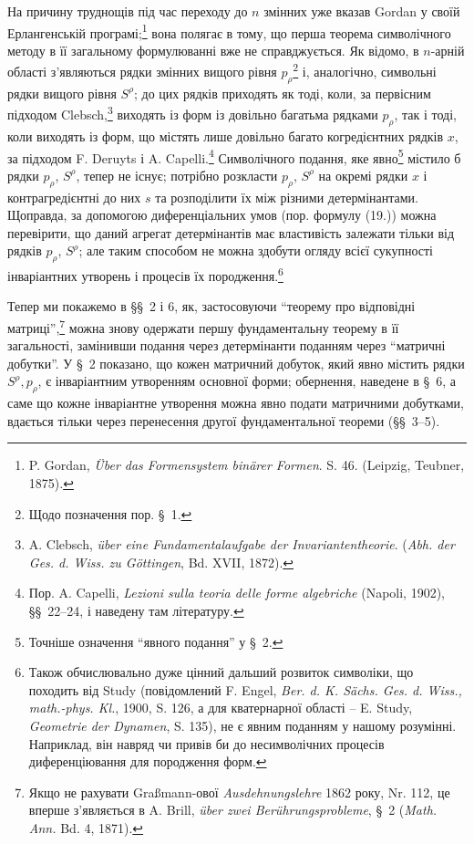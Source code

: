 \documentclass[11pt]{article}
\begin{document}
На причину труднощів під час переходу до $n$ змінних уже вказав Gordan у своїй Ерлангенській програмі;\footnote{P. Gordan, \emph{Über das Formensystem binärer Formen}. S. 46. (Leipzig, Teubner, 1875).} вона полягає в тому, що перша теорема символічного методу в її загальному формулюванні вже не справджується. Як відомо, в $n$-арній області з'являються рядки змінних вищого рівня $p_\rho$\footnote{Щодо позначення пор. \S\ 1.} і, аналогічно, символьні рядки вищого рівня $S^\rho$; до цих рядків приходять як тоді, коли, за первісним підходом Clebsch,\footnote{A. Clebsch, \emph{über eine Fundamentalaufgabe der Invariantentheorie}. (\emph{Abh. der Ges. d. Wiss. zu Göttingen}, Bd. XVII, 1872).} виходять із форм із довільно багатьма рядками $p_\rho$, так і тоді, коли виходять із форм, що містять лише довільно багато когредієнтних рядків $x$, за підходом F. Deruyts і A. Capelli.\footnote{Пор. A. Capelli, \emph{Lezioni sulla teoria delle forme algebriche} (Napoli, 1902), \S\S\ 22--24, і наведену там літературу.} Символічного подання, яке явно\footnote{Точніше означення ``явного подання'' у \S\ 2.} містило б рядки $p_\rho$, $S^\rho$, тепер не існує; потрібно розкласти $p_\rho$, $S^\rho$ на окремі рядки $x$ і контрагредієнтні до них $s$ та розподілити їх між різними детермінантами. Щоправда, за допомогою диференціальних умов (пор. формулу (19.)) можна перевірити, що даний агрегат детермінантів має властивість залежати тільки від рядків $p_\rho$, $S^\rho$; але таким способом не можна здобути огляду всієї сукупності інваріантних утворень і процесів їх породження.\footnote{Також обчислювально дуже цінний дальший розвиток символіки, що походить від Study (повідомлений F. Engel, \emph{Ber. d. K. Sächs. Ges. d. Wiss., math.-phys. Kl.}, 1900, S. 126, а для кватернарної області -- E. Study, \emph{Geometrie der Dynamen}, S. 135), не є явним поданням у нашому розумінні. Наприклад, він навряд чи привів би до несимволічних процесів диференціювання для породження форм.}

Тепер ми покажемо в \S\S\ 2 і 6, як, застосовуючи ``теорему про відповідні матриці'',\footnote{Якщо не рахувати Graßmann-ової \emph{Ausdehnungslehre} 1862 року, Nr. 112, це вперше з'являється в A. Brill, \emph{über zwei Berührungsprobleme}, \S\ 2 (\emph{Math. Ann.} Bd. 4, 1871).} можна знову одержати першу фундаментальну теорему в її загальності, замінивши подання через детермінанти поданням через ``матричні добутки''. У \S\ 2 показано, що кожен матричний добуток, який явно містить рядки $S^\rho,p_\rho$, є інваріантним утворенням основної форми; обернення, наведене в \S\ 6, а саме що кожне інваріантне утворення можна явно подати матричними добутками, вдається тільки через перенесення другої фундаментальної теореми (\S\S\ 3--5).
\end{document}
